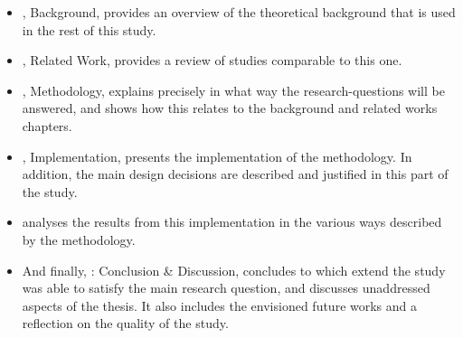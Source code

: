 \begin{itemize}[ ]
  \item {}, Background, provides an overview of the theoretical background that is used in the rest of this study.
  
  \item {}, Related Work, provides a review of studies comparable to this one.

  \item {}, Methodology, explains precisely in what way the research-questions will be answered, and shows how this relates to the background and related works chapters. 

  \item {}, Implementation, presents the implementation of the methodology.
  In addition, the main design decisions are described and justified in this part of the study.
  
  \item {} analyses the results from this implementation in the various ways described by the methodology.
  
  \item And finally, : Conclusion \& Discussion, concludes to which extend the study was able to satisfy the main research question, and discusses unaddressed aspects of the thesis.
  It also includes the envisioned future works and a reflection on the quality of the study.

\end{itemize}